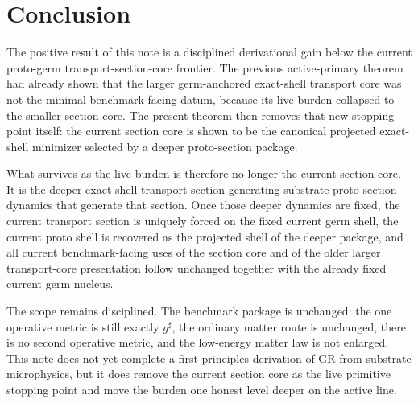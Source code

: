 \documentclass[11pt]{article}
\newcommand{\CompletedMetric}{g^{\sharp}}
\begin{document}
\section{Conclusion}

The positive result of this note is a disciplined derivational gain below the current proto-germ transport-section-core frontier. The previous active-primary theorem had already shown that the larger germ-anchored exact-shell transport core was not the minimal benchmark-facing datum, because its live burden collapsed to the smaller section core. The present theorem then removes that new stopping point itself: the current section core is shown to be the canonical projected exact-shell minimizer selected by a deeper proto-section package.

What survives as the live burden is therefore no longer the current section core. It is the deeper exact-shell-transport-section-generating substrate proto-section dynamics that generate that section. Once those deeper dynamics are fixed, the current transport section is uniquely forced on the fixed current germ shell, the current proto shell is recovered as the projected shell of the deeper package, and all current benchmark-facing uses of the section core and of the older larger transport-core presentation follow unchanged together with the already fixed current germ nucleus.

The scope remains disciplined. The benchmark package is unchanged: the one operative metric is still exactly \(\CompletedMetric\), the ordinary matter route is unchanged, there is no second operative metric, and the low-energy matter law is not enlarged. This note does not yet complete a first-principles derivation of GR from substrate microphysics, but it does remove the current section core as the live primitive stopping point and move the burden one honest level deeper on the active line.
\end{document}
